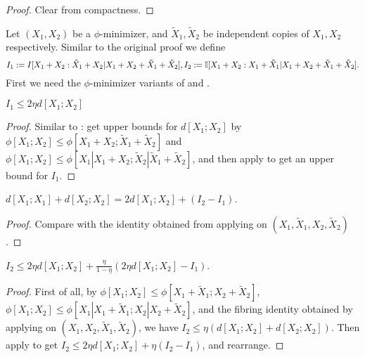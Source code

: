 \begin{proof} Clear from compactness.
\end{proof}

Let $(X_1, X_2)$ be a $\phi$-minimizer, and $\tilde X_1, \tilde X_2$ be independent copies of $X_1,X_2$ respectively.
Similar to the original proof we define
$$ I_1 :=  I [X_1+X_2 : \tilde X_1 + X_2 | X_1+X_2+\tilde X_1+\tilde X_2], I_2 := \mathbb{I}[X_1+X_2 : X_1 + \tilde X_1 | X_1+X_2+\tilde X_1+\tilde X_2].$$
First we need the $\phi$-minimizer variants of  and .

\begin{lemma}\label{phi-first-estimate}\leanok
$I_1\le 2\eta d[X_1;X_2]$
\end{lemma}

\begin{proof}
Similar to : get upper bounds for $d[X_1;X_2]$ by $\phi[X_1;X_2]\le \phi[X_1+X_2;\tilde X_1+\tilde X_2]$ and $\phi[X_1;X_2]\le \phi[X_1|X_1+X_2;\tilde X_2|\tilde X_1+\tilde X_2]$, and then apply  to get an upper bound for $I_1$.
\end{proof}

\begin{lemma}\label{I1-I2-diff}\leanok
  $d[X_1;X_1]+d[X_2;X_2]= 2d[X_1;X_2]+(I_2-I_1)$.
\end{lemma}
\begin{proof}
Compare  with the identity obtained from applying  on $(X_1,\tilde X_1, X_2, \tilde X_2)$.
\end{proof}

\begin{lemma}\label{phi-second-estimate}\leanok
$I_2\le 2\eta d[X_1;X_2] + \frac{\eta}{1-\eta}(2\eta d[X_1;X_2]-I_1)$.
\end{lemma}

\begin{proof}
First of all, by $\phi[X_1;X_2]\le \phi[X_1+\tilde X_1;X_2+\tilde X_2]$, $\phi[X_1;X_2]\le \phi[X_1|X_1+\tilde X_1;X_2|X_2+\tilde X_2]$, and the fibring identity obtained by applying  on $(X_1,X_2,\tilde X_1,\tilde X_2)$,
we have $I_2\le \eta (d[X_1;X_2]+d[X_2;X_2])$. Then apply  to get $I_2\le 2\eta d[X_1;X_2] +\eta(I_2-I_1)$, and rearrange.
\end{proof}


